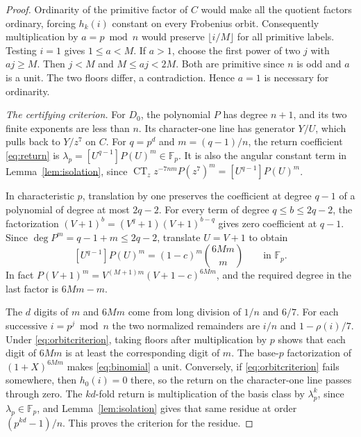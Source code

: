 \documentclass[11pt]{article}
\newcommand{\CT}{\operatorname{CT}}
\newcommand{\F}{\mathbb F}
\begin{document}
\begin{proof}
Ordinarity of the primitive factor of \(C\) would make all the quotient
factors ordinary, forcing \(h_k(i)\) constant on every Frobenius
orbit. Consequently multiplication by \(a=p\bmod n\) would preserve
\(\lfloor i/M\rfloor\) for all primitive labels. Testing \(i=1\)
gives \(1\le a<M\). If \(a>1\), choose the first power of two \(j\)
with \(aj\ge M\). Then \(j<M\) and \(M\le aj<2M\). Both are
primitive since \(n\) is odd and \(a\) is a unit. The two floors
differ, a contradiction. Hence \(a=1\) is necessary for ordinarity.

\smallskip
\noindent\textit{The certifying criterion.}
For \(D_0\), the polynomial \(P\) has degree \(n+1\), and its
two finite exponents are less than \(n\). Its character-one line
has generator \(Y/U\), which pulls back to \(Y/z^7\) on \(C\).
For \(q=p^d\) and \(m=(q-1)/n\), the return coefficient
\eqref{eq:return} is \(\lambda_p=[U^{q-1}]P(U)^m\in\F_p\).
It is also the angular constant term in Lemma~\ref{lem:isolation},
since \(\CT_z z^{-7nm}P(z^7)^m=[U^{q-1}]P(U)^m\).

In characteristic \(p\), translation by one preserves the coefficient
at degree \(q-1\) of a polynomial of degree at most \(2q-2\).
For every term of degree \(q\le b\le2q-2\), the factorization
\((V+1)^b=(V^q+1)(V+1)^{b-q}\) gives zero coefficient at \(q-1\).
Since \(\deg P^m=q-1+m\le2q-2\), translate \(U=V+1\) to obtain
\begin{equation}\label{eq:binomial}
         [U^{q-1}]P(U)^m
             =(1-c)^m\binom{6Mm}{m}\qquad\text{in }\F_p.
\end{equation}
In fact \(P(V+1)^m=V^{(M+1)m}(V+1-c)^{6Mm}\), and the required
degree in the last factor is \(6Mm-m\).

The \(d\) digits of \(m\) and \(6Mm\) come from long division of
\(1/n\) and \(6/7\). For each successive \(i=p^j\bmod n\) the
two normalized remainders are \(i/n\) and \(1-\rho(i)/7\).
Under \eqref{eq:orbitcriterion}, taking floors after multiplication
by \(p\) shows that each digit of \(6Mm\) is at least the
corresponding digit of \(m\). The base-\(p\) factorization of
\((1+X)^{6Mm}\) makes \eqref{eq:binomial} a unit. Conversely, if
\eqref{eq:orbitcriterion} fails somewhere, then \(h_0(i)=0\) there,
so the return on the character-one line passes through zero.
The \(kd\)-fold return is multiplication of the basis class by
\(\lambda_p^k\), since \(\lambda_p\in\F_p\), and
Lemma~\ref{lem:isolation} gives that same residue at order
\((p^{kd}-1)/n\). This proves the criterion for the residue.


\end{proof}
\end{document}

